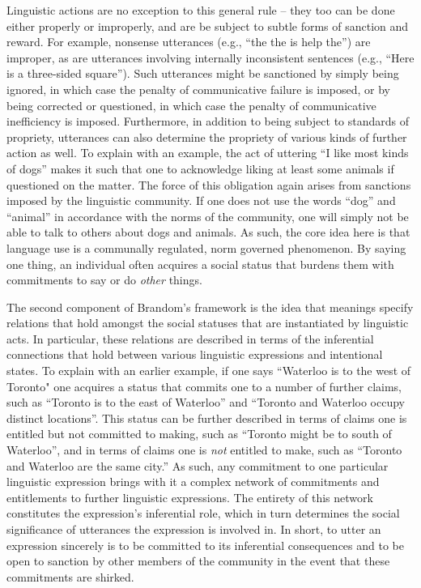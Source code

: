 Linguistic actions are no exception to this general rule -- they too can be done either properly or improperly, and are be subject to subtle forms of sanction and reward. For example, nonsense utterances (e.g., ``the the is help the'') are improper, as are utterances involving internally inconsistent sentences (e.g., ``Here is a three-sided square''). Such utterances might be sanctioned by simply being ignored, in which case the penalty of communicative failure is imposed, or by being corrected or questioned, in which case the penalty of communicative inefficiency is imposed. Furthermore, in addition to being subject to standards of propriety, utterances can also determine the propriety of various kinds of further action as well. To explain with an example, the act of uttering ``I like most kinds of dogs'' makes it such that one  to acknowledge liking at least some animals if questioned on the matter. The force of this obligation again arises from sanctions imposed by the linguistic community. If one does not use the words ``dog'' and ``animal'' in accordance with the norms of the community, one will simply not be able to talk to others about dogs and animals. As such, the core idea here is that language use is a communally regulated, norm governed phenomenon. By saying one thing, an individual often acquires a social status that burdens them with commitments to say or do \textit{other} things.

The second component of Brandom's framework is the idea that meanings specify relations that hold amongst the social statuses that are instantiated by linguistic acts. In particular, these relations are described in terms of the inferential connections that hold between various linguistic expressions and intentional states. To explain with an earlier example, if one says ``Waterloo is to the west of Toronto" one acquires a status that commits one to a number of further claims, such as ``Toronto is to the east of Waterloo'' and ``Toronto and Waterloo occupy distinct locations''. This status can be further described in terms of claims one is entitled but not committed to making, such as ``Toronto might be to south of Waterloo'', and in terms of claims one is \textit{not} entitled to make, such as ``Toronto and Waterloo are the same city.'' As such, any commitment to one particular linguistic expression brings with it a complex network of commitments and entitlements to further linguistic expressions. The entirety of this network constitutes the expression's inferential role, which in turn determines the social significance of utterances the expression is involved in. In short, to utter an expression sincerely is to be committed to its inferential consequences and to be open to sanction by other members of the community in the event that these commitments are shirked. 

